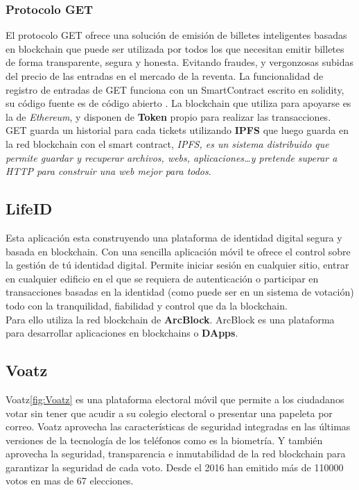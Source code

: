 \subsubsection{Protocolo GET}

El protocolo GET ofrece una solución de emisión de billetes inteligentes basadas en blockchain que puede ser utilizada por todos los que necesitan emitir billetes de forma transparente, segura y honesta. Evitando fraudes, y vergonzosas subidas del precio de las entradas en el mercado de la reventa. La funcionalidad de registro de entradas de GET funciona con un SmartContract escrito en solidity, su código fuente es de código abierto \cite{srcGET}. La blockchain que utiliza para apoyarse es la de \emph{Ethereum}, y disponen de \textbf{Token} propio para realizar las transacciones\cite{tokGET}. GET guarda un historial para cada tickets utilizando \textbf{IPFS}\cite{IPFS} que luego guarda en la red blockchain con el smart contract, \textit{IPFS, es un sistema distribuido que permite guardar y recuperar archivos, webs, aplicaciones\dots y pretende superar a HTTP para construir una web mejor para todos}.

\subsection{LifeID}

Esta aplicación esta construyendo una plataforma de identidad digital segura y basada en blockchain. Con una sencilla aplicación móvil te ofrece el control sobre la gestión de tú identidad digital. Permite iniciar sesión en cualquier sitio, entrar en cualquier edificio en el que se requiera de autenticación o participar en transacciones basadas en la identidad (como puede ser en un sistema de votación) todo con la tranquilidad, fiabilidad y control que da la blockchain. \\ 

Para ello utiliza la red blockchain de \textbf{ArcBlock}\cite{webArc,alianzaArc}. ArcBlock es una plataforma para desarrollar aplicaciones en blockchains o \textbf{DApps}\cite{dapps}. 

\subsection{Voatz}

Voatz\ref{fig:Voatz} es una plataforma electoral móvil que permite a los ciudadanos votar sin tener que acudir a su colegio electoral o presentar una papeleta por correo. Voatz aprovecha las características de seguridad integradas en las últimas versiones de la tecnología de los teléfonos como es la biometría. Y también aprovecha la seguridad, transparencia e inmutabilidad de la red blockchain para garantizar la seguridad de cada voto. Desde el 2016 han emitido más de 110000 votos en mas de 67 elecciones. 

